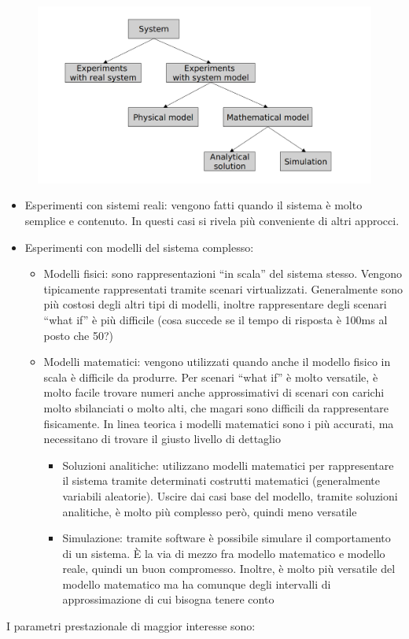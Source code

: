 \documentclass{article}
\begin{document}
		\begin{figure}[ht]
			\centering
			\includegraphics[width=0.7\linewidth]{SAC_D1_approaches}
			\label{fig:sacd1approaches}
		\end{figure}
		
		\begin{itemize}
			\item Esperimenti con sistemi reali: vengono fatti quando il sistema è molto semplice e contenuto. In questi casi si rivela più conveniente di altri approcci.
			\item Esperimenti con modelli del sistema complesso:
			\begin{itemize}
				\item Modelli fisici: sono rappresentazioni “in scala” del sistema stesso. Vengono tipicamente
				rappresentati tramite scenari virtualizzati. Generalmente sono più costosi degli altri tipi di
				modelli, inoltre rappresentare degli scenari “what if” è più difficile (cosa succede se il tempo
				di risposta è 100ms al posto che 50?)
				\item Modelli matematici: vengono utilizzati quando anche il modello fisico in scala è difficile da
				produrre. Per scenari “what if” è molto versatile, è molto facile trovare numeri anche
				approssimativi di scenari con carichi molto sbilanciati o molto alti, che magari sono difficili
				da rappresentare fisicamente. In linea teorica i modelli matematici sono i più
				accurati, ma necessitano di trovare il giusto livello di dettaglio
				\begin{itemize}
					\item Soluzioni analitiche: utilizzano modelli matematici per rappresentare il sistema tramite
					determinati costrutti matematici (generalmente variabili aleatorie). Uscire dai casi base
					del modello, tramite soluzioni analitiche, è molto più complesso però, quindi meno
					versatile
					\item Simulazione: tramite software è possibile simulare il comportamento di un sistema. È
					la via di mezzo fra modello matematico e modello reale, quindi un buon compromesso.
					Inoltre, è molto più versatile del modello matematico ma ha comunque degli intervalli di
					approssimazione di cui bisogna tenere conto
				\end{itemize}
			\end{itemize}
		\end{itemize}
		I parametri prestazionale di maggior interesse sono:
		
\end{document}
